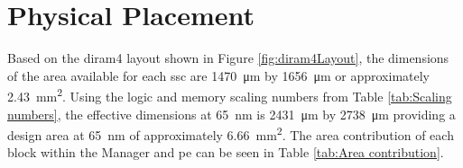 \section{Physical Placement}
\label{sec:Physical Placement}

Based on the \ac{diram4} layout shown in Figure \ref{fig:diram4Layout}, the dimensions of the area available for each \ac{ssc} are \SI{1470}{\micro\meter} by \SI{1656}{\micro\meter} or approximately \SI{2.43}{\square\milli\meter}.
Using the logic and memory scaling numbers from Table \ref{tab:Scaling numbers}, the effective dimensions at \SI{65}{\nano\meter} is \SI{2431}{\micro\meter} by \SI{2738}{\micro\meter} providing a design area at \SI{65}{\nano\meter} of approximately \SI{6.66}{\square\milli\meter}.
The area contribution of each block within the Manager and \ac{pe} can be seen in Table \ref{tab:Area contribution}.
